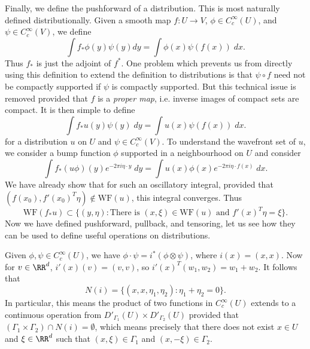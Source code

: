 Finally, we define the pushforward of a distribution. This is most naturally defined distributionally. Given a smooth map $f: U \to V$, $\phi \in C_c^\infty(U)$, and $\psi \in C_c^\infty(V)$, we define
%
\[ \int f_* \phi(y) \psi(y) dy = \int \phi(x) \psi(f(x))\; dx. \]
%
Thus $f_*$ is just the adjoint of $f^*$. One problem which prevents us from directly using this definition to extend the definition to distributions is that $\psi \circ f$ need not be compactly supported if $\psi$ is compactly supported. But this technical issue is removed provided that $f$ is a \emph{proper map}, i.e. inverse images of compact sets are compact. It is then simple to define
%
\[ \int f_* u(y) \psi(y)\; dy = \int u(x) \psi(f(x))\; dx. \]
%
for a distribution $u$ on $U$ and $\psi \in C_c^\infty(V)$. To understand the wavefront set of $u$, we consider a bump function $\phi$ supported in a neighbourhood  on $U$ and consider
%
\[ \int f_*(u \phi)(y) e^{-2 \pi i \eta \cdot y}\; dy = \int u(x) \phi(x) e^{-2 \pi i \eta \cdot f(x)}\; dx. \]
%
We have already show that for such an oscillatory integral, provided that $(f(x_0),f'(x_0)^T \eta) \not \in \text{WF}(u)$, this integral converges. Thus
%
\[ \text{WF}(f_* u) \subset \{ (y,\eta) : \text{There is $(x,\xi) \in \text{WF}(u)$ and $f'(x)^T \eta = \xi$} \}. \]
%
Now we have defined pushforward, pullback, and tensoring, let us see how they can be used to define useful operations on distributions.

\begin{example}
    Given $\phi,\psi \in C_c^\infty(U)$, we have $\phi \cdot \psi = i^*(\phi \otimes \psi)$, where $i(x) = (x,x)$. Now for $v \in \RR^d$, $i'(x)(v) = (v,v)$, so $i'(x)^T(w_1,w_2) = w_1 + w_2$. It follows that
    \[ N(i) = \{ (x,x,\eta_1,\eta_2): \eta_1 + \eta_2 = 0 \}. \]
    In particular, this means the product of two functions in $C_c^\infty(U)$ extends to a continuous operation from $D'_{\Gamma_1}(U) \times D'_{\Gamma_2}(U)$ provided that $(\Gamma_1 \times \Gamma_2) \cap N(i) = \emptyset$, which means precisely that there does not exist $x \in U$ and $\xi \in \RR^d$ such that $(x,\xi) \in \Gamma_1$ and $(x,-\xi) \in \Gamma_2$.
\end{example}

